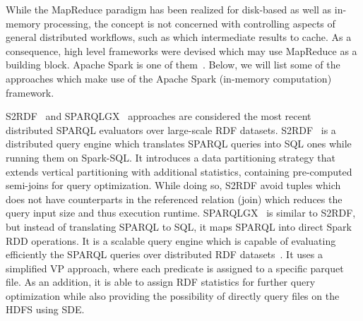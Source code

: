 While the MapReduce paradigm has been realized for disk-based as well as in-memory processing, the concept is not concerned with controlling aspects of general distributed workflows, such as which intermediate results to cache. 
As a consequence, high level frameworks were devised which may use MapReduce as a building block.
Apache Spark is one of them~\cite{zaharia2012resilient}.
Below, we will list some of the approaches which make use of the Apache Spark (in-memory computation) framework. 

S2RDF~\cite{Schatzle:2016:SRQ:2977797.2977806} and SPARQLGX~\cite{sparqlgx-iswc-2016} approaches are considered the most recent distributed SPARQL evaluators over large-scale RDF datasets.
S2RDF~\cite{Schatzle:2016:SRQ:2977797.2977806} is a distributed query engine which translates \gls{SPARQL} queries into SQL ones while running them on Spark-SQL. 
It introduces a data partitioning strategy that extends vertical partitioning with additional statistics, containing pre-computed semi-joins for query optimization.
While doing so, S2RDF avoid tuples which does not have counterparts in the referenced relation (join) which reduces the query input size and thus execution runtime.
SPARQLGX~\cite{sparqlgx-iswc-2016} is similar to S2RDF, but instead of translating \gls{SPARQL} to SQL, it maps \gls{SPARQL} into direct Spark \gls{RDD} operations. 
It is a scalable query engine which is capable of evaluating efficiently the \gls{SPARQL} queries over distributed \gls{RDF} datasets~\cite{graux2018multi}.
It uses a simplified VP approach, where each predicate is assigned to a specific parquet file. 
As an addition, it is able to assign \gls{RDF} statistics for further query optimization while also providing the possibility of directly query files on the \gls{HDFS} using SDE.
